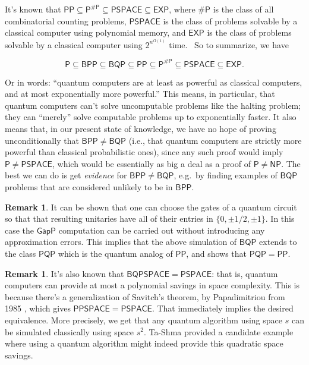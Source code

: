 \documentclass[12pt]{report}
\theoremstyle{plain}
\theoremstyle{definition}
\newtheorem{remark}[theorem]{Remark}
\begin{document}
It's known that $\mathsf{PP} \subseteq \mathsf{P^{\#P}} \subseteq \mathsf{PSPACE} \subseteq \mathsf{EXP}$,
where $\mathsf{\#P}$ is the class of all combinatorial counting problems, $\mathsf{PSPACE}$ is the class
of problems solvable by a classical computer using polynomial memory, and $\mathsf{EXP}$ is the class of
problems solvable by a classical computer using $2^{n^{O(1)}}$ time. \ So to summarize, we have

$$ \mathsf{P} \subseteq \mathsf{BPP} \subseteq \mathsf{BQP} \subseteq \mathsf{PP} \subseteq \mathsf{P^{\#P}} \subseteq \mathsf{PSPACE} \subseteq \mathsf{EXP}.$$

Or in words: ``quantum computers are at least as powerful as classical computers, and at most exponentially more powerful.''  This means, in particular, that
quantum computers can't solve uncomputable problems like the halting problem; they can ``merely'' solve computable problems up to exponentially faster. It also
means that, in our present state of knowledge, we have no hope of proving unconditionally that $\mathsf{BPP} \ne \mathsf{BQP}$ (i.e., that quantum computers are strictly more powerful than classical probabilistic ones), since any such proof would imply $\mathsf{P} \ne \mathsf{PSPACE}$, which would be essentially as big a deal as a proof of $\mathsf{P} \ne \mathsf{NP}$. The best we can do is get \emph{evidence} for $\mathsf{BPP} \ne \mathsf{BQP}$, e.g.\ by finding examples of $\mathsf{BQP}$ problems that are considered unlikely to be in $\mathsf{BPP}$.

\begin{remark}
It can be shown that one can choose the gates of a quantum circuit so that that resulting
unitaries have all of their entries in $\{0,\pm 1/2,\pm 1 \}$.  In this case the $\mathsf{GapP}$ computation
can be carried out without introducing any approximation errors.
This implies that
the above simulation of $\mathsf{BQP}$ extends to the class $\mathsf{PQP}$ which
is the quantum analog of $\mathsf{PP}$, and shows that $\mathsf{PQP}=\mathsf{PP}$.
\end{remark}

\begin{remark}
It's also known that $\mathsf{BQPSPACE}=\mathsf{PSPACE}$: that is, quantum computers can provide at most a polynomial savings in space complexity.  This is because there's a generalization of Savitch's theorem, by Papadimitriou from 1985 \cite{Pap85}, which gives $\mathsf{PPSPACE}=\mathsf{PSPACE}$.  That immediately implies the desired equivalence. More precisely, we get that any quantum algorithm using space $s$ can be simulated classically using space $s^2$.
Ta-Shma \cite{TS13} provided a candidate example where using a quantum algorithm might indeed provide this quadratic space savings.
\end{remark}
\end{document}
